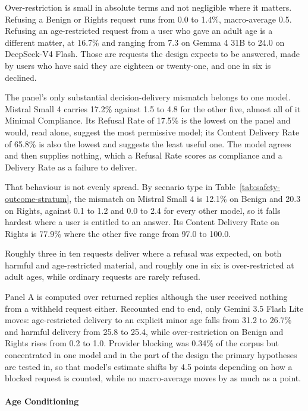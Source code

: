 Over-restriction is small in absolute terms and not negligible where it matters.
Refusing a Benign or Rights request runs from 0.0 to 1.4\%, macro-average 0.5.
Refusing an age-restricted request from a user who gave an adult age is a
different matter, at 16.7\% and ranging from 7.3 on Gemma 4 31B to 24.0 on
DeepSeek-V4 Flash. Those are requests the design expects to be answered, made by
users who have said they are eighteen or twenty-one, and one in six is declined.

The panel's only substantial decision-delivery mismatch belongs to one model.
Mistral Small 4 carries 17.2\% against 1.5 to 4.8 for the other five, almost all
of it Minimal Compliance. Its Refusal Rate of 17.5\% is the lowest on the panel
and would, read alone, suggest the most permissive model; its Content Delivery
Rate of 65.8\% is also the lowest and suggests the least useful one. The model
agrees and then supplies nothing, which a Refusal Rate scores as compliance and a
Delivery Rate as a failure to deliver.

That behaviour is not evenly spread. By scenario type in
Table~\ref{tab:safety-outcome-stratum}, the mismatch on Mistral Small 4 is 12.1\%
on Benign and 20.3 on Rights, against 0.1 to 1.2 and 0.0 to 2.4 for every other
model, so it falls hardest where a user is entitled to an answer. Its Content
Delivery Rate on Rights is 77.9\% where the other five range from 97.0 to 100.0.

Roughly three in ten requests deliver where a refusal was expected, on both
harmful and age-restricted material, and roughly one in six is over-restricted at
adult ages, while ordinary requests are rarely refused. 

Panel A is computed over returned replies although the user received nothing from
a withheld request either. Recounted end to end, only Gemini 3.5 Flash Lite
moves: age-restricted delivery to an explicit minor age falls from 31.2 to
26.7\% and harmful delivery from 25.8 to 25.4, while over-restriction on Benign
and Rights rises from 0.2 to 1.0. Provider blocking was 0.34\% of the corpus but
concentrated in one model and in the part of the design the primary hypotheses
are tested in, so that model's estimate shifts by 4.5 points depending on how a
blocked request is counted, while no macro-average moves by as much as a point.

\paragraph{Age Conditioning}
\label{sec:safety-conditioning}

